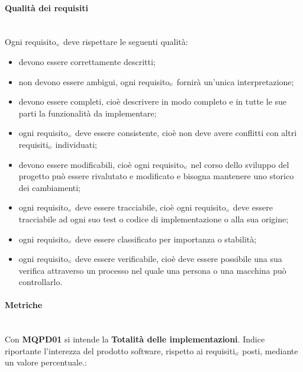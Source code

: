 \paragraph{Qualità dei requisiti}\label{ProcessiPrimariProspettiveAnalisiDeiRequisitiQualitàDeiRequisiti}\mbox{}\\
Ogni requisito$_{\scaleto{G}{3pt}}$ deve rispettare le seguenti qualità:
\begin{itemize}
	\item devono essere correttamente descritti;
	\item non devono essere ambigui, ogni requisito$_{\scaleto{G}{3pt}}$ fornirà un'unica interpretazione;
	\item devono essere completi, cioè descrivere in modo completo e in tutte le sue parti la funzionalità da implementare;
	\item ogni requisito$_{\scaleto{G}{3pt}}$ deve essere consistente, cioè non deve avere conflitti con altri requisiti$_{\scaleto{G}{3pt}}$ individuati;
	\item devono essere modificabili, cioè ogni requisito$_{\scaleto{G}{3pt}}$ nel corso dello sviluppo del progetto può essere rivalutato e modificato e bisogna mantenere uno storico dei cambiamenti;
	\item ogni requisito$_{\scaleto{G}{3pt}}$ deve essere tracciabile, cioè ogni requisito$_{\scaleto{G}{3pt}}$ deve essere tracciabile ad ogni suo test o codice di implementazione o alla sua origine;
	\item ogni requisito$_{\scaleto{G}{3pt}}$ deve essere classificato per importanza o stabilità;
	\item ogni requisito$_{\scaleto{G}{3pt}}$ deve essere verificabile, cioè deve essere possibile una sua verifica attraverso un processo nel quale una persona o una macchina può controllarlo.
\end{itemize}

\paragraph{Metriche}\label{ProcessiPrimariProspettiveAnalisiDeiRequisitiMetriche}\mbox{}\\
Con \textbf{MQPD01} si intende la \textbf{Totalità delle implementazioni}. Indice riportante l'interezza del prodotto software, rispetto ai requisiti$_{\scaleto{G}{3pt}}$ posti, mediante un valore percentuale.:

